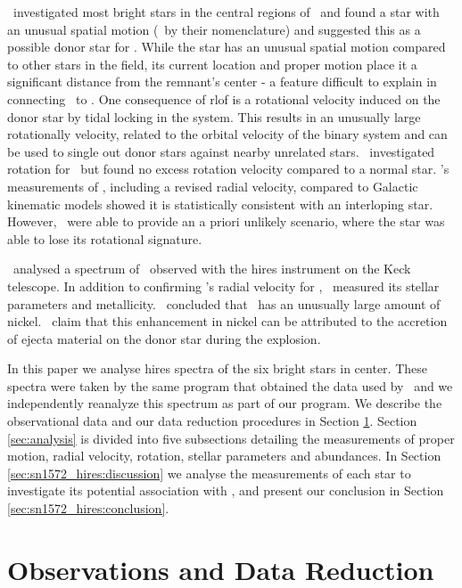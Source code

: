 \rl\ investigated most bright stars in the central regions of \ and found a star with an unusual spatial motion (\starg\ by their nomenclature) and suggested this as a possible donor star for . While the star has an unusual spatial motion compared to other stars in the field, its current location and proper motion place it a significant distance from the remnant's center - a feature difficult to explain in connecting \starg\ to . One consequence of \gls{rlof} is a rotational velocity induced on the \gls{donor} star by tidal locking in the system. This results in an unusually large rotationally velocity, related to the orbital velocity of the binary system and can be used to single out donor stars against nearby unrelated stars. \wek\ investigated rotation for  \starg\ but found no excess rotation velocity compared to a normal star. \wek's measurements of \starg, including a revised radial velocity, compared to Galactic kinematic models showed it is statistically consistent with an interloping star. However, \wek\ were able to provide an a priori unlikely scenario, where the star was able to lose its rotational signature. 

\gh\ analysed a spectrum of \starg\ observed with the \gls{hires} instrument on the Keck telescope. In addition to confirming \wek's radial velocity for \starg, \gh\ measured its stellar parameters and metallicity. \gh\ concluded that \starg\ has an unusually large amount of nickel. \gh\ claim that this enhancement in nickel can be attributed to the accretion of ejecta material on the \gls{donor} star during the explosion. 

In this paper we analyse \gls{hires} spectra of the six bright stars in  center. These spectra were taken by the same program that obtained the data used by \gh\ and we independently reanalyze this spectrum as part of our program. We describe the observational data and our data reduction procedures in Section \ref{sec:sn1572_hires:observ-data-reduct}. Section \ref{sec:analysis} is divided into five subsections detailing the measurements of proper motion, radial velocity, rotation, stellar parameters and abundances. In Section \ref{sec:sn1572_hires:discussion} we analyse the measurements of each star to investigate its potential association with , and present our conclusion in Section \ref{sec:sn1572_hires:conclusion}.

\section{Observations and Data Reduction}
\label{sec:sn1572_hires:observ-data-reduct}

